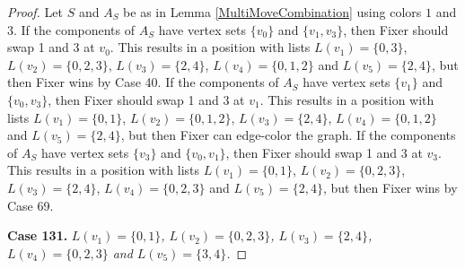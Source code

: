 \documentclass[12pt]{amsart}
\theoremstyle{plain}
\theoremstyle{definition}
\theoremstyle{remark}
\begin{document}
\begin{proof}
Let $S$ and $A_S$ be as in Lemma \ref{MultiMoveCombination} using colors $1$ and $3$. If the components of $A_S$ have vertex sets $\{v_0\}$ and $\{v_1, v_3\}$, then Fixer should swap 1 and 3 at $v_0$. This results in a position with lists $L(v_1) = \{0, 3\}$, $L(v_2) = \{0, 2, 3\}$, $L(v_3) = \{2, 4\}$, $L(v_4) = \{0, 1, 2\}$ and $L(v_5) = \{2, 4\}$, but then Fixer wins by Case 40.
If the components of $A_S$ have vertex sets $\{v_1\}$ and $\{v_0, v_3\}$, then Fixer should swap 1 and 3 at $v_1$. This results in a position with lists $L(v_1) = \{0, 1\}$, $L(v_2) = \{0, 1, 2\}$, $L(v_3) = \{2, 4\}$, $L(v_4) = \{0, 1, 2\}$ and $L(v_5) = \{2, 4\}$, but then Fixer can edge-color the graph.
If the components of $A_S$ have vertex sets $\{v_3\}$ and $\{v_0, v_1\}$, then Fixer should swap 1 and 3 at $v_3$. This results in a position with lists $L(v_1) = \{0, 1\}$, $L(v_2) = \{0, 2, 3\}$, $L(v_3) = \{2, 4\}$, $L(v_4) = \{0, 2, 3\}$ and $L(v_5) = \{2, 4\}$, but then Fixer wins by Case 69.

\noindent\textbf{Case 131.  }\textit{$L(v_1) = \{0, 1\}$, $L(v_2) = \{0, 2, 3\}$, $L(v_3) = \{2, 4\}$, $L(v_4) = \{0, 2, 3\}$ and $L(v_5) = \{3, 4\}$.}


\end{proof}
\end{document}
